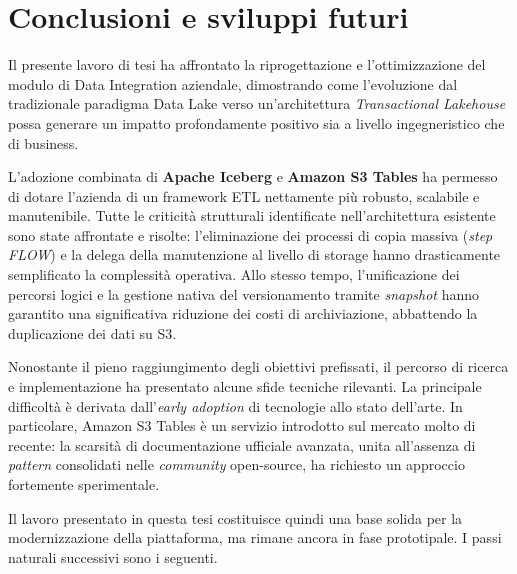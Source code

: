 \documentclass[12pt,a4paper,openright,twoside]{book}
\begin{document}
\chapter{Conclusioni e sviluppi futuri}
\label{chap:conclusioni}

Il presente lavoro di tesi ha affrontato la riprogettazione e l'ottimizzazione del modulo di Data Integration aziendale, dimostrando come l'evoluzione dal tradizionale paradigma Data Lake verso un'architettura \textit{Transactional Lakehouse} possa generare un impatto profondamente positivo sia a livello ingegneristico che di business. 

L'adozione combinata di \textbf{Apache Iceberg} e \textbf{Amazon S3 Tables} ha permesso di dotare l'azienda di un framework ETL nettamente più robusto, scalabile e manutenibile. Tutte le criticità strutturali identificate nell'architettura esistente sono state affrontate e risolte: l'eliminazione dei processi di copia massiva (\textit{step FLOW}) e la delega della manutenzione al livello di storage hanno drasticamente semplificato la complessità operativa. Allo stesso tempo, l'unificazione dei percorsi logici e la gestione nativa del versionamento tramite \textit{snapshot} hanno garantito una significativa riduzione dei costi di archiviazione, abbattendo la duplicazione dei dati su S3.

Nonostante il pieno raggiungimento degli obiettivi prefissati, il percorso di ricerca e implementazione ha presentato alcune sfide tecniche rilevanti. La principale difficoltà è derivata dall'\textit{early adoption} di tecnologie allo stato dell'arte. In particolare, Amazon S3 Tables è un servizio introdotto sul mercato molto di recente: la scarsità di documentazione ufficiale avanzata, unita all'assenza di \textit{pattern} consolidati nelle \textit{community} open-source, ha richiesto un approccio fortemente sperimentale.

Il lavoro presentato in questa tesi costituisce quindi una base solida per la modernizzazione della piattaforma, ma rimane ancora in fase prototipale. I passi naturali successivi sono i seguenti.
\end{document}
